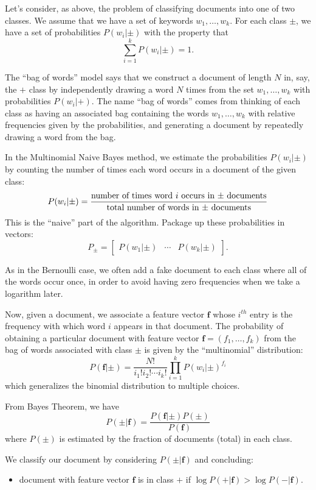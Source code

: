\documentclass[
]{article}
\providecommand{\tightlist}{%
  \setlength{\itemsep}{0pt}\setlength{\parskip}{0pt}}
\begin{document}
Let's consider, as above, the problem of classifying documents into one
of two classes. We assume that we have a set of keywords
\(w_1,\ldots, w_k\). For each class \(\pm\), we have a set of
probabilities \(P(w_i|\pm)\) with the property that \[
\sum_{i=1}^{k}P(w_{i}|\pm)=1.
\]

The ``bag of words'' model says that we construct a document of length
\(N\) in, say, the \(+\) class by independently drawing a word \(N\)
times from the set \(w_1,\ldots, w_k\) with probabilities
\(P(w_{i}|+)\). The name ``bag of words'' comes from thinking of each
class as having an associated bag containing the words
\(w_1,\ldots, w_k\) with relative frequencies given by the
probabilities, and generating a document by repeatedly drawing a word
from the bag.

In the Multinomial Naive Bayes method, we estimate the probabilities
\(P(w_{i}|\pm)\) by counting the number of times each word occurs in a
document of the given class: \[
P(w_{i}|\pm) = \frac{\hbox{\rm number of times word $i$ occurs in $\pm$ documents}}{\hbox{\rm total number of words in $\pm$ documents}}
\] This is the ``naive'' part of the algorithm. Package up these
probabilities in vectors: \[
P_{\pm} = \left[\begin{array}{ccc} P(w_{1}|\pm) & \cdots & P(w_{k}|\pm)\end{array}\right].
\]

As in the Bernoulli case, we often add a fake document to each class
where all of the words occur once, in order to avoid having zero
frequencies when we take a logarithm later.

Now, given a document, we associate a feature vector \(\mathbf{f}\)
whose \(i^{th}\) entry is the frequency with which word \(i\) appears in
that document. The probability of obtaining a particular document with
feature vector \(\mathbf{f}=(f_1,\ldots, f_k)\) from the bag of words
associated with class \(\pm\) is given by the ``multinomial''
distribution: \[
P(\mathbf{f}|\pm)=\frac{N!}{i_1!i_2!\cdots i_k!} \prod_{i=1}^{k} P(w_{i}|\pm)^{f_{i}}
\] which generalizes the binomial distribution to multiple choices.

From Bayes Theorem, we have \[
P(\pm|\mathbf{f}) = \frac{P(\mathbf{f}|\pm)P(\pm)}{P(\mathbf{f})}
\] where \(P(\pm)\) is estimated by the fraction of documents (total) in
each class.

We classify our document by considering \(P(\pm|\mathbf{f})\) and
concluding:

\begin{itemize}
\tightlist
\item
  document with feature vector \(\mathbf{f}\) is in class \(+\) if
  \(\log P(+|\mathbf{f})>\log P(-|\mathbf{f})\).
\end{itemize}
\end{document}
